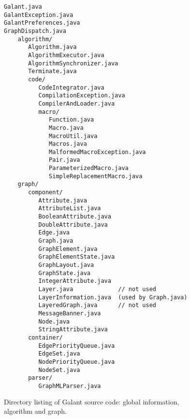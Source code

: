 \begin{figure}

  \begin{center}
      \begin{minipage}{4in}
  \small
\begin{verbatim}
Galant.java
GalantException.java
GalantPreferences.java
GraphDispatch.java
    algorithm/
       Algorithm.java
       AlgorithmExecutor.java
       AlgorithmSynchronizer.java
       Terminate.java
       code/
          CodeIntegrator.java
          CompilationException.java
          CompilerAndLoader.java
          macro/
             Function.java
             Macro.java
             MacroUtil.java
             Macros.java
             MalformedMacroException.java
             Pair.java
             ParameterizedMacro.java
             SimpleReplacementMacro.java
    graph/
       component/
          Attribute.java
          AttributeList.java
          BooleanAttribute.java
          DoubleAttribute.java
          Edge.java
          Graph.java
          GraphElement.java
          GraphElementState.java
          GraphLayout.java
          GraphState.java
          IntegerAttribute.java
          Layer.java             // not used
          LayerInformation.java  (used by Graph.java)
          LayeredGraph.java      // not used
          MessageBanner.java
          Node.java
          StringAttribute.java
       container/
          EdgePriorityQueue.java
          EdgeSet.java
          NodePriorityQueue.java
          NodeSet.java
       parser/
          GraphMLParser.java
\end{verbatim}
      \end{minipage}
  \end{center}

  \medskip
  \caption{Directory listing of Galant source code: global information,
    algorithm and graph.}
  \label{fig:directory_listing_graph}
\end{figure}

